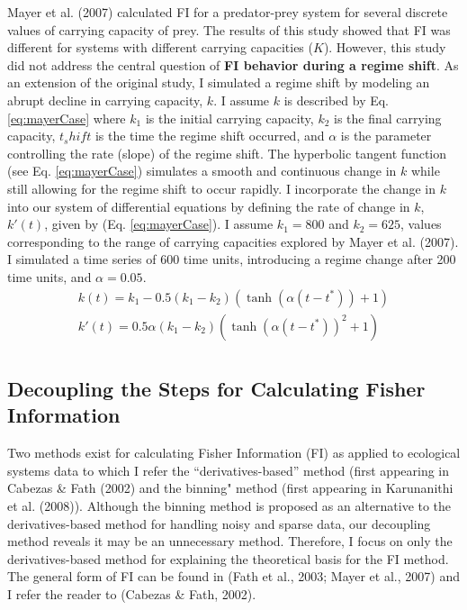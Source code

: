 \documentclass[12pt,twoside,openany]{reedthesis}
\begin{document}
Mayer et al. (2007) calculated FI for a predator-prey system for several discrete values of carrying capacity of prey. The results of this study showed that FI was different for systems with different carrying capacities (\(K\)). However, this study did not address the central question of \textbf{FI behavior during a regime shift}. As an extension of the original study, I simulated a regime shift by modeling an abrupt decline in carrying capacity, \(k\). I assume \(k\) is described by Eq. \eqref{eq:mayerCase} where \(k_1\) is the initial carrying capacity, \(k_2\) is the final carrying capacity, \(t_shift\) is the time the regime shift occurred, and \(\alpha\) is the parameter controlling the rate (slope) of the regime shift. The hyperbolic tangent function (see Eq. \eqref{eq:mayerCase}) simulates a smooth and continuous change in \(k\) while still allowing for the regime shift to occur rapidly. I incorporate the change in \(k\) into our system of differential equations by defining the rate of change in \(k\), \(k'(t)\), given by (Eq. \eqref{eq:mayerCase}). I assume \(k_1=800\) and \(k_2=625\), values corresponding to the range of carrying capacities explored by Mayer et al. (2007). I simulated a time series of 600 time units, introducing a regime change after 200 time units, and \(\alpha=0.05\).
\begin{equation}  
\begin{array}{rcr}
  k(t) = k_1  - 0.5(k_1-k_2)(\tanh(\alpha (t-t^*))+1) \\ 
  k'(t) = 0.5\alpha (k_1-k_2)(\tanh(\alpha(t-t^*))^2 +1) \\
\label{eq:mayerCase}
\end{array}
\end{equation}
\hypertarget{decoupling-the-steps-for-calculating-fisher-information}{%
\subsection{Decoupling the Steps for Calculating Fisher Information}\label{decoupling-the-steps-for-calculating-fisher-information}}

Two methods exist for calculating Fisher Information (FI) as applied to ecological systems data to which I refer the ``derivatives-based'' method (first appearing in Cabezas \& Fath (2002) and the binning" method (first appearing in Karunanithi et al. (2008)). Although the binning method is proposed as an alternative to the derivatives-based method for handling noisy and sparse data, our decoupling method reveals it may be an unnecessary method. Therefore, I focus on only the derivatives-based method for explaining the theoretical basis for the FI method. The general form of FI can be found in (Fath et al., 2003; Mayer et al., 2007) and I refer the reader to (Cabezas \& Fath, 2002).
\end{document}
